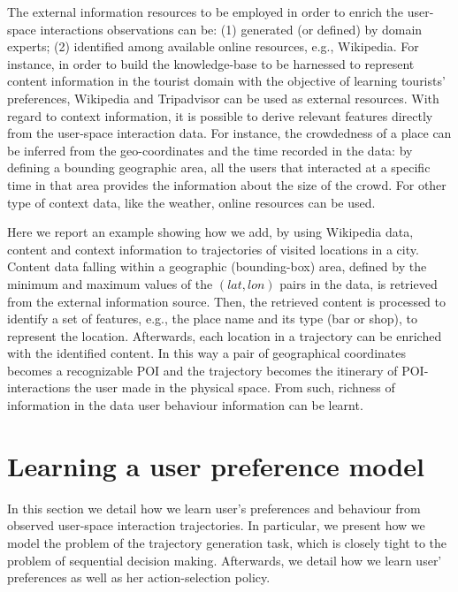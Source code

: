 The external information resources to be employed in order to enrich the user-space interactions observations can be: (1) generated (or defined) by domain experts; (2) identified among available online resources, e.g., Wikipedia.
For instance, in order to build the knowledge-base to be harnessed to represent content information in the tourist domain with the objective of learning tourists' preferences, Wikipedia and Tripadvisor can be used as external resources.
With regard to context information, it is possible to derive relevant features directly from the user-space interaction data. For instance, the crowdedness of a place can be inferred from the geo-coordinates and the time recorded in the data: by defining a bounding geographic area, all the users that interacted at a specific time in that area provides the information about the size of the crowd. For other type of context data, like the weather, online resources can be used.

Here we report an example showing how we add, by using Wikipedia data, content and context information to trajectories of visited locations in a city.
Content data falling within a geographic (bounding-box) area, defined by the minimum and maximum values of the $(lat,lon)$ pairs in the data, is retrieved from the external information source. %
Then, the retrieved content is processed to identify a set of features, e.g., the place name and its type (bar or shop), to represent the location. 
Afterwards, each location in a trajectory can be enriched with the identified content. In this way a pair of geographical coordinates becomes a recognizable POI and the trajectory becomes the itinerary of POI-interactions the user made in the physical space. From such, richness of information in the data user behaviour information can be learnt.

\section{Learning a user preference model}
\label{sec:learning_user_preferences}
In this section we detail how we learn user's preferences and behaviour from observed user-space interaction trajectories.
In particular, we present how we model the problem of the trajectory generation task, which is closely tight to the problem of sequential decision making. Afterwards, we detail how we  learn user' preferences as well as her action-selection policy. 

